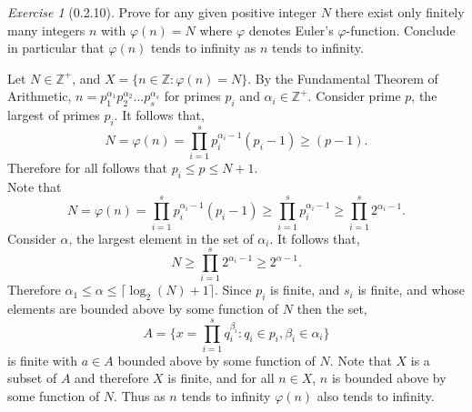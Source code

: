 \documentclass[12pt]{amsart}
\makeatletter
\theoremstyle{remark}
\newtheorem*{exercise}{Exercise}%
\def\ZZ{\ensuremath{\mathbb Z}}
\renewenvironment{proof}[1][\proofname]{\par\doublespacing
  \pushQED{\qed}%
  \normalfont \topsep6\p@\@plus6\p@\relax
  \list{}{%
    \settowidth{\leftmargin}{\itshape\proofname:\hskip\labelsep}%
    \setlength{\labelwidth}{0pt}%
    \setlength{\itemindent}{-\leftmargin}%
  }%
  \item[\hskip\labelsep\itshape#1\@addpunct{:}]\ignorespaces
}{%
  \popQED\endlist\@endpefalse
  \singlespacing
}
\theoremstyle{mycomment}
\makeatother
\begin{document}
 
  \begin{exercise}[0.2.10] Prove for any given positive integer $N$ there exist only finitely many integers $n$ 
    with $\varphi(n) = N$ where $\varphi$ denotes Euler's $\varphi$-function. Conclude in particular that 
    $\varphi(n)$ tends to infinity as $n$ tends to infinity.
    \begin{proof} 
      Let $N \in \ZZ^{+}$, and $X = \{n \in \ZZ: \varphi(n) = N\}$. By the Fundamental Theorem of Arithmetic, $n = p_1^{\alpha_1}p_2^{\alpha_2} \dots p_s^{\alpha_s}$
      for primes $p_i$ and $\alpha_i \in \ZZ^+$. Consider prime $p$, the largest of primes $p_i$. It follows that, 
      \begin{equation*}
        N = \varphi(n) = \prod_{i = 1}^s p_i^{\alpha_i - 1}(p_i - 1) \geq (p - 1).
      \end{equation*}
      Therefore for all follows that $p_i \leq p \leq N+1$.\\

      Note that
      \begin{equation*}
        N = \varphi(n) = \prod_{i = 1}^s p_i^{\alpha_i - 1}(p_i - 1) \geq \prod_{i = 1}^s p_i^{\alpha_i - 1} \geq \prod_{i = 1}^s 2^{\alpha_i - 1}. 
      \end{equation*}
      Consider $\alpha$, the largest element in the set of $\alpha_i$. It follows that, 
      \begin{equation*}
        N \geq \prod_{i = 1}^s 2^{\alpha_i - 1} \geq 2^{\alpha - 1}.
      \end{equation*}
      Therefore $\alpha_1 \leq \alpha \leq \lceil\log_2(N) + 1\rceil$.
      Since $p_i$ is finite, and $s_i$ is finite, and whose elements are bounded above by some function of $N$ then the set,
      \begin{equation*}
      A  = \{x = \prod_{i = 1}^s q_{i}^{\beta_i}: q_i \in p_i, \beta_i \in \alpha_i\}
      \end{equation*} 
      is finite with $a \in A$ bounded above by some function of $N$. 
      Note that $X$ is a subset of $A$ and therefore $X$ is finite, and for all $n \in X$, $n$ is bounded above by some function of $N$. Thus as $n$ tends to infinity $\varphi(n)$ also tends to infinity.  
    \end{proof}
    \end{exercise}
\end{document}
